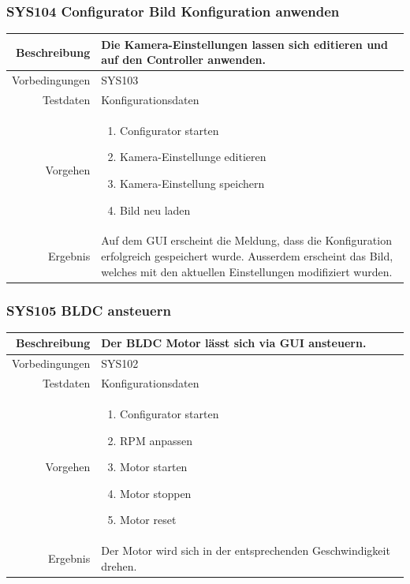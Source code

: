 \subsubsection{SYS104 Configurator Bild Konfiguration anwenden }
\begin{table}[h!]
	\renewcommand{\arraystretch}{1.5}
	\begin{tabular}{|r|p{14cm}|}
		\hline Beschreibung & Die Kamera-Einstellungen lassen sich editieren und auf den Controller anwenden. \\ 
		\hline Vorbedingungen & SYS103 \\ 
		\hline Testdaten & Konfigurationsdaten \\ 
		\hline Vorgehen & 
		\begin{enumerate}
			\item Configurator starten
			\item Kamera-Einstellunge editieren
			\item Kamera-Einstellung speichern
			\item Bild neu laden
		\end{enumerate} \\ 
		\hline Ergebnis & Auf dem GUI erscheint die Meldung, dass die Konfiguration erfolgreich gespeichert wurde.
		Ausserdem erscheint das Bild, welches mit den aktuellen Einstellungen modifiziert wurden. \\ 
		\hline 
	\end{tabular}
\end{table}

\subsubsection{SYS105 BLDC ansteuern}
\begin{table}[h!]
	\renewcommand{\arraystretch}{1.5}
	\begin{tabular}{|r|p{14cm}|}
		\hline Beschreibung & Der BLDC Motor lässt sich via GUI ansteuern. \\ 
		\hline Vorbedingungen & SYS102 \\ 
		\hline Testdaten & Konfigurationsdaten \\ 
		\hline Vorgehen & 
		\begin{enumerate}
			\item Configurator starten
			\item RPM anpassen
			\item Motor starten
			\item Motor stoppen
			\item Motor reset
		\end{enumerate} \\ 
		\hline Ergebnis & Der Motor wird sich in der entsprechenden Geschwindigkeit drehen. \\ 
		\hline 
	\end{tabular}
\end{table}

